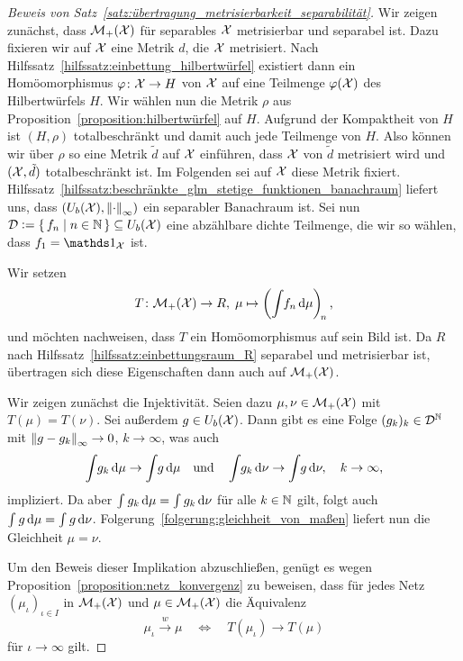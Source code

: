 \documentclass[../thesis/thesis.tex]{subfiles}
\begin{document}
	\begin{proof}[Beweis von Satz~\ref{satz:übertragung_metrisierbarkeit_separabilität}]
		Wir zeigen zunächst, dass $\mathcal{M}_{+}(\mathcal{X})$ für separables $\mathcal{X}$ metrisierbar und separabel ist. Dazu fixieren wir auf $\mathcal{X}$ eine Metrik $d$, die $\mathcal{X}$ metrisiert. 
		Nach Hilfssatz~\ref{hilfssatz:einbettung_hilbertwürfel} existiert dann ein Homöomorphismus $\varphi \colon \mathcal{X} \to H$ von
		$\mathcal{X}$ auf eine Teilmenge $\varphi(\mathcal{X})$ des Hilbertwürfels $H$. Wir wählen nun die Metrik $\rho$ aus Proposition~\ref{proposition:hilbertwürfel} auf $H$. Aufgrund der Kompaktheit von $H$ ist
		$(H, \rho)$ totalbeschränkt und damit auch jede Teilmenge von $H$. Also können wir über $\rho$ so eine Metrik $\tilde{d}$ auf $\mathcal{X}$ einführen, dass $\mathcal{X}$ von $\tilde{d}$ 
		metrisiert wird und $(\mathcal{X}, \tilde{d})$ totalbeschränkt ist. Im Folgenden sei auf $\mathcal{X}$ diese Metrik fixiert. Hilfssatz~\ref{hilfssatz:beschränkte_glm_stetige_funktionen_banachraum} liefert uns, dass 
		$(U_b(\mathcal{X}), \left\lVert\cdot\right\rVert_\infty)$ ein separabler Banachraum ist. Sei nun $\mathcal{D} \vcentcolon = \left\{\, f_n \; \middle| \; n \in \mathbb{N} \,\right\} \subseteq U_b(\mathcal{X})$ eine abzählbare dichte Teilmenge, 
		die wir so wählen, dass $f_1 = \indfct_\X$ ist.
		
		Wir setzen
		\[ T \colon \mathcal{M}_{+}(\mathcal{X}) \to R, \; \mu \mapsto \left( \int_{} \, f_n \, \mathrm{d}\mu \right)_{\! n}  \text{,} \]
		und möchten nachweisen, dass $T$ ein Homöomorphismus auf sein Bild ist. Da $R$ nach Hilfssatz~\ref{hilfssatz:einbettungsraum_R} separabel und metrisierbar ist, übertragen sich diese Eigenschaften dann auch auf $\mathcal{M}_{+}(\mathcal{X})$.
		
		Wir zeigen zunächst die Injektivität. Seien dazu $\mu, \nu \in \mathcal{M}_{+}(\mathcal{X})$ mit $T(\mu) = T(\nu)$. 
		Sei außerdem $g \in U_b(\mathcal{X})$. Dann gibt es eine Folge $(g_k)_k \in \mathcal{D}^{\mathbb{N}}$ mit $\left\lVert g - g_k\right\rVert_\infty \to 0$, $k \to \infty$, was auch 
		\[ \int_{} \, g_k \, \mathrm{d}\mu \to \int_{} \, g \, \mathrm{d}\mu \quad \text{und} \quad \int_{} \, g_k \, \mathrm{d}\nu \to \int_{} \, g \, \mathrm{d}\nu, \quad k \to \infty \text{,} \]
		impliziert. Da aber $\int_{} \, g_k \, \mathrm{d}\mu = \int_{} \, g_k \, \mathrm{d}\nu$ für alle $k \in \mathbb{N}$ gilt, folgt auch $\int_{} \, g \, \mathrm{d}\mu = \int_{} \, g \, \mathrm{d}\nu$.
		Folgerung~\ref{folgerung:gleichheit_von_maßen} liefert nun die Gleichheit $\mu = \nu$.
		
		Um den Beweis dieser Implikation abzuschließen, genügt es wegen Proposition~\ref{proposition:netz_konvergenz} zu beweisen, dass für jedes Netz $(\mu_\iota)_{\iota \in I}$ in $\mathcal{M}_{+}(\mathcal{X})$ und $\mu \in \mathcal{M}_{+}(\mathcal{X})$ die
		Äquivalenz
		\[ \mu_\iota \xrightarrow{w} \mu \quad \iff \quad T(\mu_\iota) \to T(\mu)  \]
		für $\iota \to \infty$ gilt.
		

\end{proof}
\end{document}
